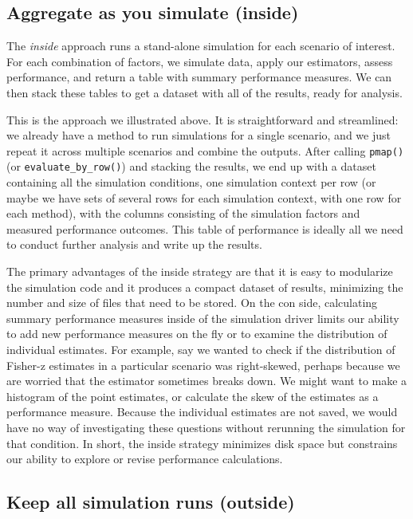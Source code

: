 \documentclass[
]{book}
\begin{document}
\subsection{Aggregate as you simulate (inside)}\label{aggregate-as-you-simulate-inside}

The \emph{inside} approach runs a stand-alone simulation for each scenario of interest. For each combination of factors, we simulate data, apply our estimators, assess performance, and return a table with summary performance measures. We can then stack these tables to get a dataset with all of the results, ready for analysis.

This is the approach we illustrated above. It is straightforward and streamlined: we already have a method to run simulations for a single scenario, and we just repeat it across multiple scenarios and combine the outputs.
After calling \texttt{pmap()} (or \texttt{evaluate\_by\_row()}) and stacking the results, we end up with a dataset containing all the simulation conditions, one simulation context per row (or maybe we have sets of several rows for each simulation context, with one row for each method), with the columns consisting of the simulation factors and measured performance outcomes.
This table of performance is ideally all we need to conduct further analysis and write up the results.

The primary advantages of the inside strategy are that it is easy to modularize the simulation code and it produces a compact dataset of results, minimizing the number and size of files that need to be stored.
On the con side, calculating summary performance measures inside of the simulation driver limits our ability to add new performance measures on the fly or to examine the distribution of individual estimates.
For example, say we wanted to check if the distribution of Fisher-z estimates in a particular scenario was right-skewed, perhaps because we are worried that the estimator sometimes breaks down.
We might want to make a histogram of the point estimates, or calculate the skew of the estimates as a performance measure.
Because the individual estimates are not saved, we would have no way of investigating these questions without rerunning the simulation for that condition.
In short, the inside strategy minimizes disk space but constrains our ability to explore or revise performance calculations.

\subsection{Keep all simulation runs (outside)}\label{keep-all-simulation-runs-outside}
\end{document}
